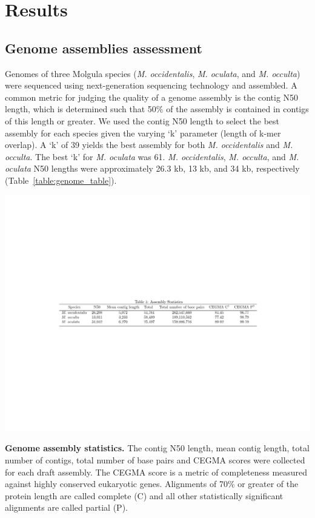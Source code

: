 \section{Results}
\subsection{Genome assemblies assessment}
Genomes of three Molgula species (\textit{M. occidentalis}, \textit{M. oculata}, and \textit{M. occulta}) were sequenced using next-generation sequencing technology and assembled. A common metric for judging the quality of a genome assembly is the contig N50 length, which is determined such that 50\% of the assembly is contained in contigs of this length or greater. We used the contig N50 length to select the best assembly for each species given the varying `k' parameter (length of k-mer overlap). A `k' of 39 yields the best assembly for both \textit{M. occidentalis} and \textit{M. occulta}. The best `k' for \textit{M. oculata} was 61. \textit{M. occidentalis}, \textit{M. occulta}, and \textit{M. oculata} N50 lengths were approximately 26.3 kb, 13 kb, and 34 kb, respectively (Table~\ref{table:genome_table}).

\begin{table}[tbp]
\centering
\includegraphics[width=\linewidth]{figures/genome_table_1}
\caption{\textbf{Genome assembly statistics.} The contig N50 length, mean contig length, total number of contigs, total number of base pairs and CEGMA scores were collected for each draft assembly. The CEGMA score is a metric of completeness measured against highly conserved eukaryotic genes. Alignments of 70\% or greater of the protein length are called complete (C) and all other statistically significant alignments are called partial (P).}
\label{table:genome_table}
\end{table}

